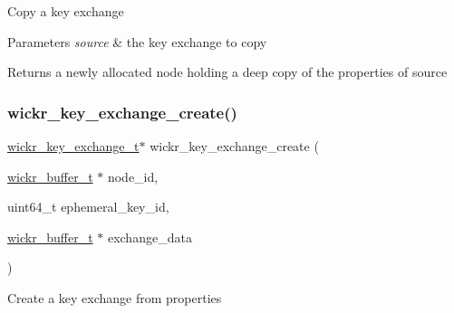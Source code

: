 Copy a key exchange


\begin{DoxyParams}{Parameters}
{\em source} & the key exchange to copy \\
\hline
\end{DoxyParams}
\begin{DoxyReturn}{Returns}
a newly allocated node holding a deep copy of the properties of \textquotesingle{}source\textquotesingle{} 
\end{DoxyReturn}
\mbox{\label{group__wickr__protocol_gac2823b3430070b0db9ef1f40d3a804ea}} 
\subsubsection{\texorpdfstring{wickr\+\_\+key\+\_\+exchange\+\_\+create()}{wickr\_key\_exchange\_create()}}
{\footnotesize\ttfamily \hyperlink{structwickr__key__exchange}{wickr\+\_\+key\+\_\+exchange\+\_\+t}$\ast$ wickr\+\_\+key\+\_\+exchange\+\_\+create (\begin{DoxyParamCaption}\item[{\hyperlink{structwickr__buffer}{wickr\+\_\+buffer\+\_\+t} $\ast$}]{node\+\_\+id,  }\item[{uint64\+\_\+t}]{ephemeral\+\_\+key\+\_\+id,  }\item[{\hyperlink{structwickr__buffer}{wickr\+\_\+buffer\+\_\+t} $\ast$}]{exchange\+\_\+data }\end{DoxyParamCaption})}

Create a key exchange from properties


